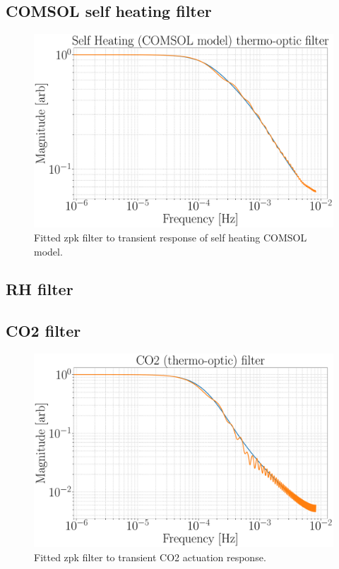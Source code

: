 \subsection{COMSOL self heating filter}
\begin{figure}[H]
\includegraphics[width=\textwidth]{figs/TCS/self_heating_zpk.pdf}
\caption{Fitted zpk filter to transient response of self heating COMSOL model.}
\label{fig:self_zpk_fit}
\end{figure}

\subsection{RH filter}


\subsection{CO2 filter}
\begin{figure}[H]
\includegraphics[width=\textwidth]{figs/TCS/CO2_zpk.pdf}
\caption{Fitted zpk filter to transient CO2 actuation response.}
\label{fig:co2_zpk_fit}
\end{figure}

